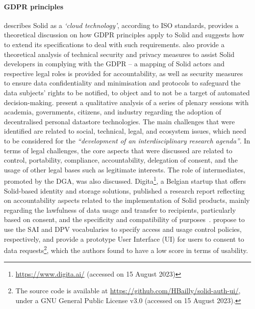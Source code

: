 \paragraph{GDPR principles}
\cite{pandit_making_2023} describes Solid as a \textit{`cloud technology'}, according to ISO standards, provides a theoretical discussion on how GDPR principles apply to Solid and suggests how to extend its specifications to deal with such requirements.
\cite{esposito_assessing_2023} also provide a theoretical analysis of technical security and privacy measures to assist Solid developers in complying with the GDPR -- a mapping of Solid actors and respective legal roles is provided for accountability, as well as security measures to ensure data confidentiality and minimisation and protocols to safeguard the data subjects' rights to be notified, to object and to not be a target of automated decision-making.
\cite{van_damme_towards_2022} present a qualitative analysis of a series of plenary sessions with academia, governments, citizens, and industry regarding the adoption of decentralised personal datastore technologies. The main challenges that were identified are related to social, technical, legal, and ecosystem issues, which need to be considered for the \textit{``development of an interdisciplinary research agenda''}. In terms of legal challenges, the core aspects that were discussed are related to control, portability, compliance, accountability, delegation of consent, and the usage of other legal bases such as legitimate interests. The role of intermediates, promoted by the DGA, was also discussed. %
Digita\footnote{\url{https://www.digita.ai/} (accessed on 15 August 2023)}, a Belgian startup that offers Solid-based identity and storage solutions, published a research report reflecting on accountability aspects related to the implementation of Solid products, mainly regarding the lawfulness of data usage and transfer to recipients, particularly based on consent, and the specificity and compatibility of purposes~\citep{de_bot_data_2021}.
\cite{bailly_prototyping_2023} propose to use the SAI and DPV vocabularies to specify access and usage control policies, respectively, and provide a prototype User Interface (UI) for users to consent to data requests\footnote{The source code is available at \url{https://github.com/HBailly/solid-auth-ui/}, under a GNU General Public License v3.0 (accessed on 15 August 2023).}, which the authors found to have a low score in terms of usability.

